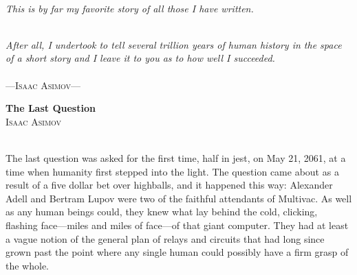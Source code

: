 \documentclass[11pt,twocolumn,paper=a5,pagesize]{article}
\newcommand{\initial}[1]{ \lettrine[lines=3,lhang=0.3,nindent=0em]{  {\textsf{#1}}}{}}
\begin{document}
\thispagestyle{empty}


{\small {}} 

\newpage
\ 
\newpage

\thispagestyle{empty}
\vspace*{2cm}

\begin{center}
\textit{This is by far my favorite story of all those I have written.}

\ \\

\textit{After all, I undertook to tell several trillion years of human history 
in the space of a short story and I leave it to you as to how well I 
succeeded.}
\\ \ \\

---\textsc{Isaac Asimov}---
\end{center}

\newpage
\setcounter{page}{1}

{
	\textbf{The Last Question}\\
	\textsc{Isaac Asimov}\\
}
\ \\



\pagebreak


\initial{T}he last question was asked for the first time, half in jest, on May 21, 
2061, at a time when humanity first stepped into the light. The question
came about as a result of a five dollar bet over highballs, and it happened
this way:
Alexander Adell and Bertram Lupov were two of the faithful attendants of 
Multivac. As well as any human beings could, they knew what lay behind the 
cold, clicking, flashing face---miles and miles of face---of that giant
computer. They had at least a vague notion of the general plan of relays 
and circuits that had long since grown past the point where any single 
human could possibly have a firm grasp of the whole.
\end{document}

